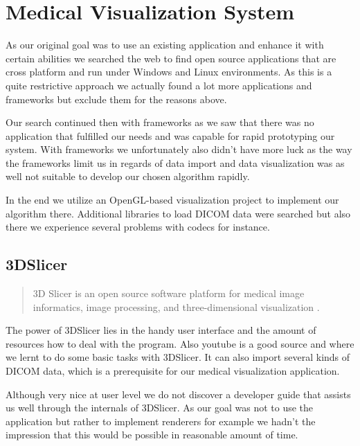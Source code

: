 \section{Medical Visualization System}

As our original goal was to use an existing application and enhance it with certain abilities we searched the web to find open source applications that are cross platform and run under Windows and Linux environments.
As this is a quite restrictive approach we actually found a lot more applications and frameworks but exclude them for the reasons above.

Our search continued then with frameworks as we saw that there was no application that fulfilled our needs and was capable for rapid prototyping our system.
With frameworks we unfortunately also didn't have more luck as the way the frameworks limit us in regards of data import and data visualization was as well not suitable to develop our chosen algorithm rapidly.

In the end we utilize an OpenGL-based visualization project to implement our algorithm there. Additional libraries to load DICOM data were searched but also there we experience several problems with codecs for instance.

%

\subsection{3DSlicer}

\blockquote{3D Slicer is an open source software platform for medical image informatics, image processing, and three-dimensional visualization \cite{3DSlicer_2018}.}

The power of 3DSlicer lies in the handy user interface and the amount of resources how to deal with the program. Also youtube is a good source and where we lernt to do some basic tasks with 3DSlicer. It can also import several kinds of DICOM data, which is a prerequisite for our medical visualization application.

Although very nice at user level we do not discover a developer guide that assists us well through the internals of 3DSlicer.
As our goal was not to use the application but rather to implement renderers for example we hadn't the impression that this would be possible in reasonable amount of time.


